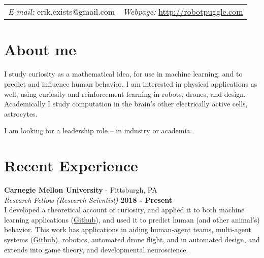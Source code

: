\documentclass[margin,line]{res}
\begin{document}
\newcommand{\link}[1]{\texttt{#1}}
\providecommand{\tightlist}{%
    \setlength{\itemsep}{0pt}\setlength{\parskip}{0pt}}



\begin{resume}
\section{\sc }
\vspace{.05in}

\begin{tabular}{@{}p{2in}p{4in}}
{\it E-mail:}  erik.exists@gmail.com   & {\it Webpage:} \href{http://robotpuggle.com}{http://robotpuggle.com} \\
\end{tabular}

\vspace{-.1cm}
\section{\sc About me}
I study curiosity as a mathematical idea, for use in machine learning, and to predict and influence human behavior. I am interested in physical applications as well, using curiosity and reinforcement learning in robots, drones, and design. Academically I study computation in the brain’s other electrically active cells, astrocytes. 

\vspace{-.3cm}
I am looking for a leadership role -- in industry or academia.

\section{\sc Recent Experience}
\vspace{-.2cm}
{\bf Carnegie Mellon University} - Pittsburgh, PA \\
{\em Research Fellow (Research Scientist)} \hfill {\bf 2018 - Present}\\
I developed a theoretical account of curiosity, and applied it to both machine learning applications (\href{https://github.com/CoAxLab/infomercial}{Github}), and used it to predict human (and other animal's) behavior. This work has applications in aiding human-agent teams, multi-agent systems (\href{https://github.com/parenthetical-e/parkid}{Github}), robotics, automated drone flight, and in automated design, and extends into game theory, and developmental neuroscience.


\end{resume}
\end{document}

